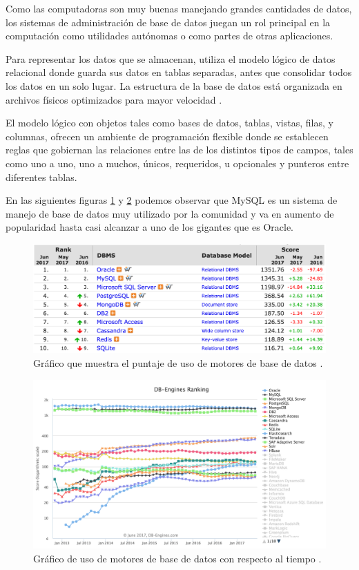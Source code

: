 Como las computadoras son muy buenas manejando grandes cantidades de datos, los sistemas de administración de base de datos juegan un rol principal en la computación como utilidades autónomas o como partes de otras aplicaciones.

Para representar los datos que se almacenan, utiliza el modelo lógico de datos relacional donde guarda sus datos en tablas separadas, antes que consolidar todos los datos en un solo lugar. La estructura de la base de datos está organizada en archivos físicos optimizados para mayor velocidad \citep{ronstrom2004mysql}. 

El modelo lógico con objetos tales como bases de datos, tablas, vistas, filas, y columnas, ofrecen un ambiente de programación flexible donde se establecen reglas que gobiernan las relaciones entre las de los distintos tipos de campos, tales como uno a uno, uno a muchos, únicos, requeridos, u opcionales y punteros entre diferentes tablas.

En las siguientes figuras \ref{graph_db_1} y \ref{graph_db_2} podemos observar que MySQL es un sistema de manejo de base de datos muy utilizado por la comunidad y va en aumento de popularidad hasta casi alcanzar a uno de los gigantes que es Oracle.

\begin{figure}[H]
\centering
\includegraphics[width=125mm,scale=1]{Figuras/tecnologias/rank_db_1}
\caption{Gráfico que muestra el puntaje de uso de motores de base de datos \citep{db_engines_page}.}
  \label{graph_db_1}
\end{figure}

\begin{figure}[H]
\centering
\includegraphics[width=125mm,scale=1]{Figuras/tecnologias/rank_db_2}
\caption{Gráfico de uso de motores de base de datos con respecto al tiempo \citep{db_engines_page}.}
  \label{graph_db_2}
\end{figure}

